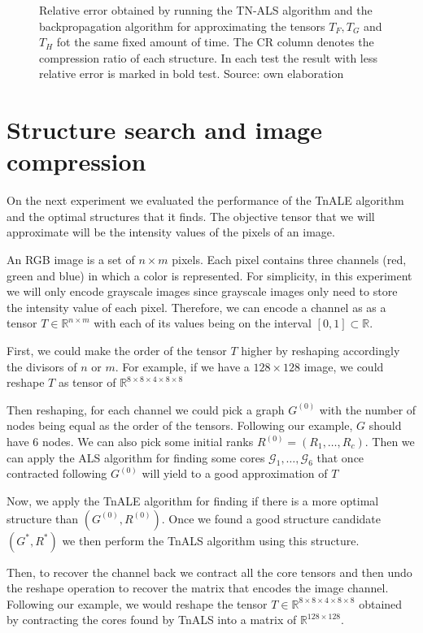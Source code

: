 \documentclass[11pt,a4paper,openright,oneside]{book}
\numberwithin{equation}{section}
\begin{document}
{\begin{figure}
\caption{Relative error obtained by running the TN-ALS algorithm and the backpropagation algorithm for approximating
    the tensors $T_F, T_G$ and $T_H$ fot the same fixed amount of time. The CR column denotes the compression ratio of each structure.
In each test the result with less relative error is marked in bold test. Source: own elaboration}
\label{fig:ap-table-backprop}
\end{figure}

\section{Structure search and image compression}

On the next experiment we evaluated the performance of the \gls{TnALE} algorithm and the optimal structures that it finds. The objective tensor
that we will approximate will be the intensity values of the pixels of an image.

An RGB image is a set of $n \times m$ pixels. Each pixel contains
three channels (red, green and blue) in which a color is represented. 
For simplicity, in this experiment we will only encode grayscale images since grayscale images
only need to store the intensity value of each pixel. Therefore, we can encode a channel as
as a tensor $T \in \mathbb{R}^{n \times m}$ with each of its values
being on the interval $[0,1] \subset \mathbb{R}$.

First, we could make the order of the tensor $T$ higher by reshaping accordingly the divisors of $n$ or $m$. For example,
if we have a $128 \times 128$ image, we could reshape $T$ as tensor of $\mathbb{R}^{8 \times 8 \times 4 \times 8 \times 8 }$

Then reshaping, for each channel we could pick a graph $G^{(0)}$ with the number of nodes being equal as the order of the tensors. Following our example,
$G$ should have $6$ nodes. We can also pick some initial ranks $R^{(0)} = (R_1, \dots, R_c)$. Then we can apply the ALS algorithm for
finding some cores $\mathcal{G}_1, \dots, \mathcal{G}_6$ that once contracted following $G^{(0)}$ will yield to a good approximation
of $T$

Now, we apply the \gls{TnALE} algorithm for finding if there is a more optimal structure than $(G^{(0)}, R^{(0)})$. Once we found a good
structure candidate $(G^*, R^*)$ we then perform the TnALS algorithm using this structure.

Then, to recover the channel back we contract all the core tensors and then undo the reshape operation to recover the matrix that
encodes the image channel. Following our example, we would reshape the tensor $T \in \mathbb{R}^{ 8 \times 8 \times 4 \times 8 \times 8}$
obtained by contracting the cores found by TnALS into a matrix of $\mathbb{R}^{128 \times 128}$.

}
\end{document}
